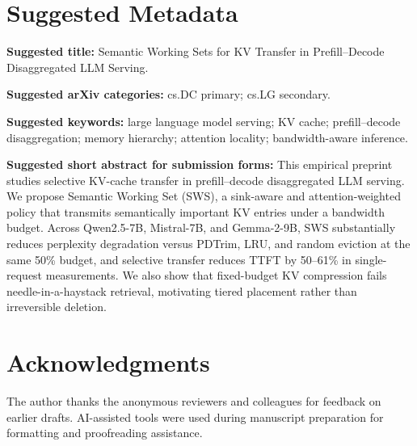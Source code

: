 \documentclass[11pt]{article}
\newcommand{\pct}{\%}
\theoremstyle{definition}
\theoremstyle{plain}
\begin{document}
\section{Suggested Metadata}
\label{app:metadata}

\textbf{Suggested title:} Semantic Working Sets for KV Transfer in Prefill--Decode Disaggregated LLM Serving.

\textbf{Suggested arXiv categories:} cs.DC primary; cs.LG secondary.

\textbf{Suggested keywords:} large language model serving; KV cache; prefill--decode disaggregation; memory hierarchy; attention locality; bandwidth-aware inference.

\textbf{Suggested short abstract for submission forms:} This empirical preprint studies selective KV-cache transfer in prefill--decode disaggregated LLM serving.  We propose Semantic Working Set (SWS), a sink-aware and attention-weighted policy that transmits semantically important KV entries under a bandwidth budget.  Across Qwen2.5-7B, Mistral-7B, and Gemma-2-9B, SWS substantially reduces perplexity degradation versus PDTrim, LRU, and random eviction at the same 50\pct{} budget, and selective transfer reduces TTFT by 50--61\pct{} in single-request measurements.  We also show that fixed-budget KV compression fails needle-in-a-haystack retrieval, motivating tiered placement rather than irreversible deletion.

\section*{Acknowledgments}
The author thanks the anonymous reviewers and colleagues for feedback on earlier drafts.  AI-assisted tools were used during manuscript preparation for formatting and proofreading assistance.
\end{document}
